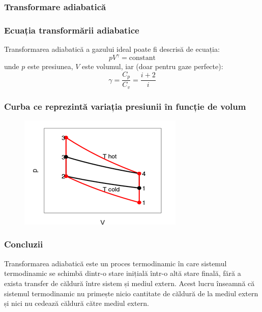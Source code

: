 \documentclass{beamer}
\begin{document}
\begin{frame}
\frametitle{Transformare adiabatică}
\end{frame}

\begin{frame}
\frametitle{Ecuația transformării adiabatice}
Transformarea adiabatică a gazului ideal poate fi descrisă de ecuația:
\begin{equation}
pV^{\gamma} = \text{constant}
\end{equation}
unde $p$ este presiunea, $V$ este volumul, iar (doar pentru gaze perfecte):
\begin{equation}
\gamma = \frac{C_p}{C_v} = \frac{i+2}{i}
\end{equation}
\end{frame}

\begin{frame}
\frametitle{Curba ce reprezintă variația presiunii în funcție de volum}
\begin{figure}
\includegraphics[width=\textwidth]{Picture1.png}
\end{figure}
\end{frame}

\begin{frame}
\frametitle{Concluzii}
Transformarea adiabatică este un proces termodinamic în care sistemul termodinamic se schimbă dintr-o stare inițială într-o altă stare finală, fără a exista transfer de căldură între sistem și mediul extern. Acest lucru înseamnă că sistemul termodinamic nu primește nicio cantitate de căldură de la mediul extern și nici nu cedează căldură către mediul extern.

\end{frame}
\end{document}
